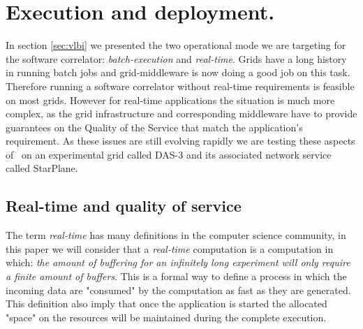 \section{Execution and deployment.}\label{sec:network}
In section \ref{sec:vlbi} we presented the two operational mode we are
targeting for the software correlator: \emph{batch-execution} and
\emph{real-time}. Grids have a long history in running batch jobs and
grid-middleware is now doing a good job on this task. Therefore
running a software correlator without real-time requirements is
feasible on most grids. However for real-time applications the
situation is much more complex, as the grid infrastructure and
corresponding middleware have to provide guarantees on the Quality of
the Service that match the application's requirement. As these issues
are still evolving rapidly we are testing these aspects of \scarie\ on
an experimental grid called DAS-3 and its associated network service
called StarPlane.

\subsection{Real-time and quality of service}
The term \emph{real-time} has many definitions in the computer science
community, in this paper we will consider that a \emph{real-time}
computation is a computation in which: \emph{the amount of buffering
  for an infinitely long experiment will only require a finite amount
  of buffers}. This is a formal way to define a process in which the
incoming data are "consumed" by the computation as fast as they are
generated. This definition also imply that once the application is
started the allocated "space" on the resources will be maintained
during the complete execution.

